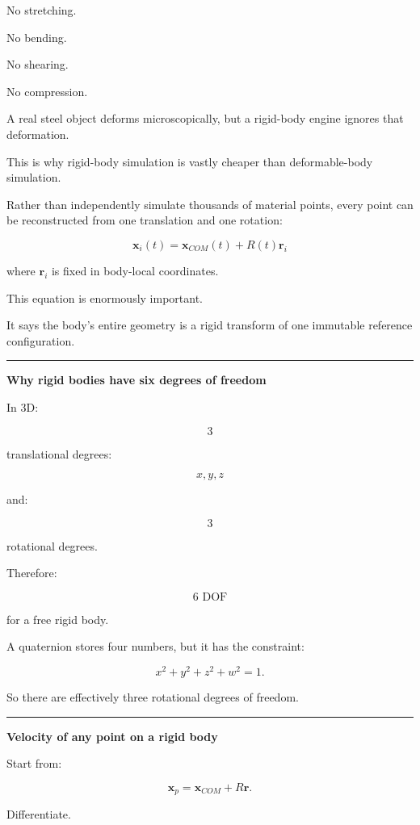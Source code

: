 No stretching.

No bending.

No shearing.

No compression.

A real steel object deforms microscopically, but a rigid-body engine ignores that deformation.

This is why rigid-body simulation is vastly cheaper than deformable-body simulation.

Rather than independently simulate thousands of material points, every point can be reconstructed from one translation and one rotation:

\[
\boxed{
\mathbf{x}_i(t)
=
\mathbf{x}_{COM}(t)
+
R(t)\mathbf{r}_i
}
\]

where \(\mathbf{r}_i\) is fixed in body-local coordinates.

This equation is enormously important.

It says the body's entire geometry is a rigid transform of one immutable reference configuration.

\begin{center}\rule{0.5\linewidth}{0.5pt}\end{center}

\textbf{Why rigid bodies have six degrees of freedom}

In 3D:

\[
3
\]

translational degrees:

\[
x,y,z
\]

and:

\[
3
\]

rotational degrees.

Therefore:

\[
\boxed{6\text{ DOF}}
\]

for a free rigid body.

A quaternion stores four numbers, but it has the constraint:

\[
x^2+y^2+z^2+w^2=1.
\]

So there are effectively three rotational degrees of freedom.

\begin{center}\rule{0.5\linewidth}{0.5pt}\end{center}

\textbf{Velocity of any point on a rigid body}

Start from:

\[
\mathbf{x}_p
=
\mathbf{x}_{COM}
+
R\mathbf{r}.
\]

Differentiate.


